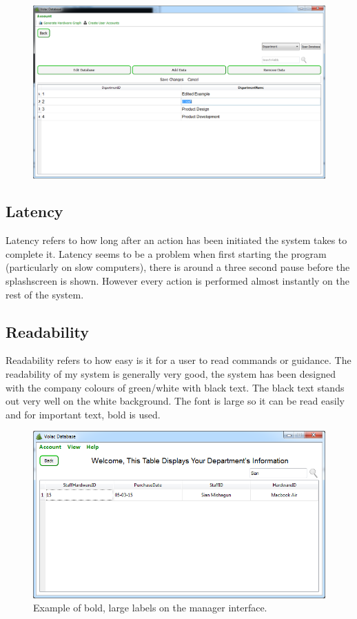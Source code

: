 \begin{figure}[H]
    \includegraphics[width=\textwidth]{./Evaluation/Images/admin2.png}
\end{figure}

\subsection{Latency}

Latency refers to how long after an action has been initiated the system takes to complete it. Latency seems to be a problem when first starting the program (particularly on slow computers), there is around a three second pause before the splashscreen is shown. However every action is performed almost instantly on the rest of the system.

\subsection{Readability}

Readability refers to how easy is it for a user to read commands or guidance. The readability of my system is generally very good, the system has been designed with the company colours of green/white with black text. The black text stands out very well on the white background. The font is large so it can be read easily and for important text, bold is used.

\begin{figure}[H]
    \includegraphics[width=\textwidth]{./Evaluation/Images/managersearch.png}
    \caption{Example of bold, large labels on the manager interface.} 
\end{figure}

